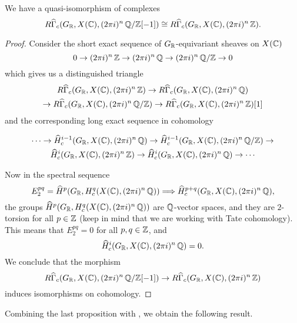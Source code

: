 \begin{proposition}
  We have a quasi-isomorphism of complexes
  \[ R\widehat{\Gamma}_c (G_{\mathbb{R}}, X (\mathbb{C}), (2\pi i)^n\,\mathbb{Q}/\mathbb{Z} [-1]) \cong
    R\widehat{\Gamma}_c (G_{\mathbb{R}}, X (\mathbb{C}), (2\pi i)^n\,\mathbb{Z}). \]

  \begin{proof}
    Consider the short exact sequence of $G_{\mathbb{R}}$-equivariant sheaves on
    $X (\mathbb{C})$
    $$0 \to (2\pi i)^n\,\mathbb{Z} \to (2\pi i)^n\,\mathbb{Q} \to (2\pi i)^n\,\mathbb{Q}/\mathbb{Z} \to 0$$
    which gives us a distinguished triangle
    \begin{multline*}
      R\widehat{\Gamma}_c (G_{\mathbb{R}}, X (\mathbb{C}), (2\pi i)^n\,\mathbb{Z}) \to
      R\widehat{\Gamma}_c (G_{\mathbb{R}}, X (\mathbb{C}), (2\pi i)^n\,\mathbb{Q}) \\
      \to R\widehat{\Gamma}_c (G_{\mathbb{R}}, X (\mathbb{C}), (2\pi i)^n\,\mathbb{Q}/\mathbb{Z}) \to
      R\widehat{\Gamma}_c (G_{\mathbb{R}}, X (\mathbb{C}), (2\pi i)^n\,\mathbb{Z}) [1]
    \end{multline*}
    and the corresponding long exact sequence in cohomology

    \begin{multline*}
      \cdots \to \widehat{H}_c^{i-1} (G_{\mathbb{R}}, X (\mathbb{C}), (2\pi i)^n\,\mathbb{Q}) \to
      \widehat{H}_c^{i-1} (G_{\mathbb{R}}, X (\mathbb{C}), (2\pi i)^n\,\mathbb{Q}/\mathbb{Z}) \to\\
      \widehat{H}_c^i (G_{\mathbb{R}}, X (\mathbb{C}), (2\pi i)^n\,\mathbb{Z}) \to
      \widehat{H}_c^i (G_{\mathbb{R}}, X (\mathbb{C}), (2\pi i)^n\,\mathbb{Q}) \to \cdots
    \end{multline*}

    Now in the spectral sequence
    \[ E_2^{pq} = \widehat{H}^p (G_{\mathbb{R}}, H^q_c (X (\mathbb{C}), (2\pi i)^n\,\mathbb{Q})) \Longrightarrow
      \widehat{H}^{p+q}_c (G_{\mathbb{R}}, X (\mathbb{C}), (2\pi i)^n\,\mathbb{Q}), \]
    the groups $\widehat{H}^p (G_{\mathbb{R}}, H^q_c (X (\mathbb{C}), (2\pi i)^n\,\mathbb{Q}))$ are
    $\mathbb{Q}$-vector spaces, and they are $2$-torsion for all $p \in \mathbb{Z}$
    (keep in mind that we are working with Tate cohomology). This means that
    $E_2^{pq} = 0$ for all $p,q\in \mathbb{Z}$, and
    $$\widehat{H}_c^i (G_{\mathbb{R}}, X (\mathbb{C}), (2\pi i)^n\,\mathbb{Q}) = 0.$$
    We conclude that the morphism
    \[ R\widehat{\Gamma}_c (G_{\mathbb{R}}, X (\mathbb{C}), (2\pi i)^n\,\mathbb{Q}/\mathbb{Z} [-1]) \to
      R\widehat{\Gamma}_c (G_{\mathbb{R}}, X (\mathbb{C}), (2\pi i)^n\,\mathbb{Z}) \]
      induces isomorphisms on cohomology.
    \end{proof}
\end{proposition}

Combining the last proposition with , we obtain the
following result.

